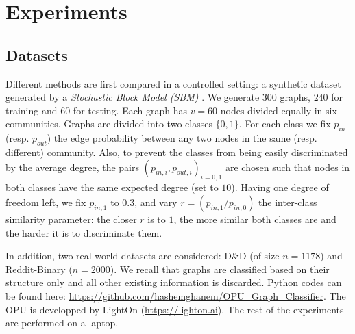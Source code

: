 \documentclass{article}
\begin{document}
\section{Experiments}\label{sec:experiments}
\subsection{Datasets}\label{sec:setup}
%
Different methods are first compared in a controlled setting: a synthetic dataset generated by a \emph{Stochastic Block Model (SBM)} \cite{SBM}. We generate $300$ graphs, $240$ for training  and $60$ for testing. Each graph has $v=60$ nodes divided equally in six communities. Graphs are divided into two classes $\{0 , 1\}$. For each class we fix $p_{in}$ (resp. $p_{out}$) the edge probability between any two nodes in the same (resp. different) community. Also, to prevent the classes from being easily discriminated by the average degree, the pairs $(p_{in,i} , p_{out,i})_{i=0,1}$ are chosen such that nodes in both classes have the same expected degree (set to $10$). Having one degree of freedom left, we fix $p_{in,1}$ to $0.3$, and vary $r=(p_{in,1}/p_{in,0})$ the inter-class similarity parameter: the closer $r$ is to $1$, the more similar both classes are and the harder it is to discriminate them.

In addition, two real-world datasets are considered: D\&D \cite{DD_ref} (of size $n=1178$) and Reddit-Binary \cite{class_Reddit} ($n=2000$). We recall that graphs are classified based on their structure only and all other existing information is discarded. 
Python codes can be found here:  \url{https://github.com/hashemghanem/OPU_Graph_Classifier}. The OPU is developped by LightOn (\url{https://lighton.ai}). The rest of the experiments are performed on a laptop.


\end{document}
